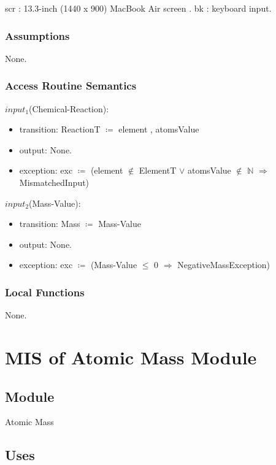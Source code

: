 \documentclass[12pt, titlepage]{article}
\begin{document}
scr :  13.3-inch (1440 x 900) MacBook Air screen .
\newline
bk : keyboard input. 

\subsubsection{Assumptions}

None.

\subsubsection{Access Routine Semantics}

\noindent $input_1$(Chemical-Reaction):
\begin{itemize}
\item transition: ReactionT $\coloneqq$ element , atomsValue
\item output:  None.
\item exception: exc $\coloneqq$ (element $\notin$ ElementT $\lor$ atomsValue $\notin$ $\mathbb{N}$ $\Rightarrow$  MismatchedInput)
\end{itemize}

\noindent $input_2$(Mass-Value):
\begin{itemize}
\item transition: Mass  $\coloneqq$ Mass-Value
\item output:  None.
\item exception: exc $\coloneqq$ (Mass-Value $\leq$ 0 $\Rightarrow$  NegativeMassException)
\end{itemize}

\subsubsection{Local Functions}
 
None.


\newpage

\section{MIS of Atomic Mass Module} \label{Atomic Mass} 

\subsection{Module}

Atomic Mass

\subsection{Uses}
\end{document}
